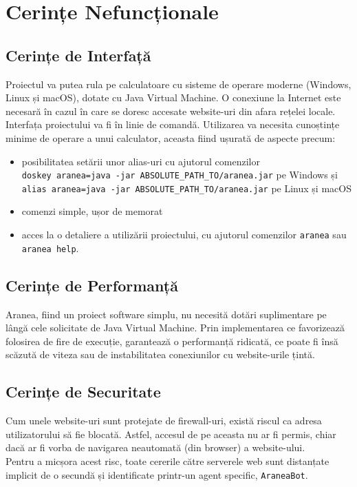 \documentclass[12pt]{article}
\begin{document}
\newpage

\section{Cerințe Nefuncționale}

\hypertarget{interface_link}{\subsection{Cerințe de Interfață}}

Proiectul va putea rula pe calculatoare cu sisteme de operare moderne (Windows, Linux și macOS), dotate cu Java Virtual Machine. O conexiune la Internet este necesară în cazul în care se doresc accesate website-uri din afara rețelei locale. \\
Interfața proiectului va fi în linie de comandă. Utilizarea va necesita cunoștințe minime de operare a unui calculator, aceasta fiind ușurată de aspecte precum:
\begin{itemize}
    \item posibilitatea setării unor alias-uri cu ajutorul comenzilor \\ \texttt{doskey aranea=java -jar ABSOLUTE_PATH_TO/aranea.jar} pe Windows și \texttt{alias aranea=java -jar ABSOLUTE_PATH_TO/aranea.jar} pe Linux și macOS
    \item comenzi simple, ușor de memorat
    \item acces la o detaliere a utilizării proiectului, cu ajutorul comenzilor \texttt{aranea} sau \texttt{aranea help}. 
\end{itemize}

\subsection{Cerințe de Performanță}

Aranea, fiind un proiect software simplu, nu necesită dotări suplimentare pe lângă cele solicitate de Java Virtual Machine. Prin implementarea ce favorizează folosirea de fire de execuție, garantează o performanță ridicată, ce poate fi însă scăzută de viteza sau de instabilitatea conexiunilor cu website-urile țintă.

\subsection{Cerințe de Securitate}

Cum unele website-uri sunt protejate de firewall-uri, există riscul ca adresa utilizatorului să fie blocată. Astfel, accesul de pe aceasta nu ar fi permis, chiar dacă ar fi vorba de navigarea neautomată (din browser) a website-ului. \\
Pentru a micșora acest risc, toate cererile către serverele web sunt distanțate implicit de o secundă și identificate printr-un agent specific, \texttt{AraneaBot}.
\end{document}
